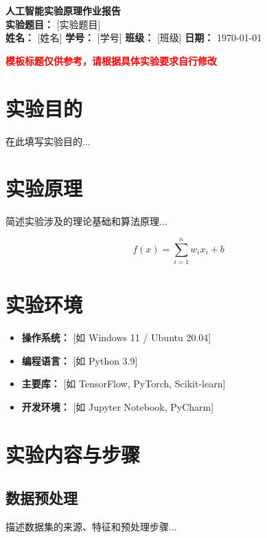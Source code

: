 \documentclass[a4paper,11pt]{article}
\begin{document}
\begin{center}
    {\LARGE \textbf{人工智能实验原理作业报告}} \\[0.3cm]
    {\Large \textbf{实验题目：} [实验题目] } \\[0.2cm]
    \textbf{姓名：} [姓名] \quad \textbf{学号：} [学号] \quad \textbf{班级：} [班级] \quad \textbf{日期：} \today
\end{center}

\begin{center}
\makebox[\textwidth]{\dotfill}
\end{center}

{\noindent \Large \textbf{\textcolor{red}{模板标题仅供参考，请根据具体实验要求自行修改}}}

\section{实验目的}

在此填写实验目的...

\section{实验原理}
简述实验涉及的理论基础和算法原理...

\begin{equation}
    f(x) = \sum_{i=1}^{n} w_i x_i + b
\end{equation}

\section{实验环境}
\begin{itemize}
    \item \textbf{操作系统：} [如 Windows 11 / Ubuntu 20.04]
    \item \textbf{编程语言：} [如 Python 3.9]
    \item \textbf{主要库：} [如 TensorFlow, PyTorch, Scikit-learn]
    \item \textbf{开发环境：} [如 Jupyter Notebook, PyCharm]
\end{itemize}

\section{实验内容与步骤}
\subsection{数据预处理}
描述数据集的来源、特征和预处理步骤...
\end{document}

